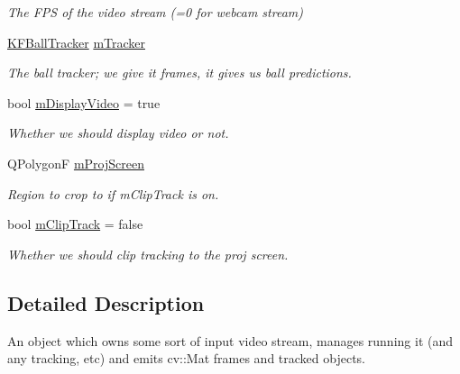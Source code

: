 \begin{DoxyCompactItemize}
\begin{DoxyCompactList}\small\item\em The F\+PS of the video stream (=0 for webcam stream) \end{DoxyCompactList}\item 
\hyperlink{classKFBallTracker}{K\+F\+Ball\+Tracker} \hyperlink{classTrackingStream_a8688b11aff0a2c013694288f2a38f760}{m\+Tracker}\hypertarget{classTrackingStream_a8688b11aff0a2c013694288f2a38f760}{}\label{classTrackingStream_a8688b11aff0a2c013694288f2a38f760}

\begin{DoxyCompactList}\small\item\em The ball tracker; we give it frames, it gives us ball predictions. \end{DoxyCompactList}\item 
bool \hyperlink{classTrackingStream_acd94132ac50274a2fbab74bdc2c0f074}{m\+Display\+Video} = true\hypertarget{classTrackingStream_acd94132ac50274a2fbab74bdc2c0f074}{}\label{classTrackingStream_acd94132ac50274a2fbab74bdc2c0f074}

\begin{DoxyCompactList}\small\item\em Whether we should display video or not. \end{DoxyCompactList}\item 
Q\+PolygonF \hyperlink{classTrackingStream_a727e9ad460936eed4b4c2c56500bdf2a}{m\+Proj\+Screen}\hypertarget{classTrackingStream_a727e9ad460936eed4b4c2c56500bdf2a}{}\label{classTrackingStream_a727e9ad460936eed4b4c2c56500bdf2a}

\begin{DoxyCompactList}\small\item\em Region to crop to if m\+Clip\+Track is on. \end{DoxyCompactList}\item 
bool \hyperlink{classTrackingStream_ab44ee1ddda70629e3de216ad8f735166}{m\+Clip\+Track} = false\hypertarget{classTrackingStream_ab44ee1ddda70629e3de216ad8f735166}{}\label{classTrackingStream_ab44ee1ddda70629e3de216ad8f735166}

\begin{DoxyCompactList}\small\item\em Whether we should clip tracking to the proj screen. \end{DoxyCompactList}\end{DoxyCompactItemize}


\subsection{Detailed Description}
An object which owns some sort of input video stream, manages running it (and any tracking, etc) and emits cv\+::\+Mat frames and tracked objects. 

